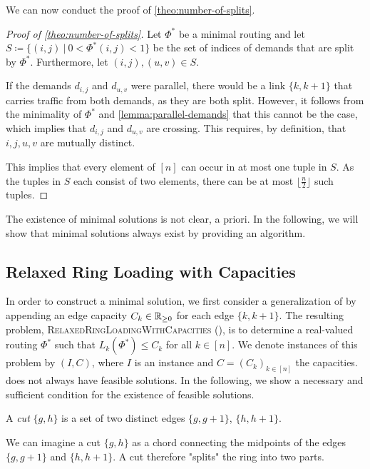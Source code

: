 We can now conduct the proof of \cref{theo:number-of-splits}.
\begin{proof}[Proof of \cref{theo:number-of-splits}]
	Let $\Phi^\ast$ be a minimal routing and let $S \coloneqq \{(i, j)\ |\ 0 < \Phi^\ast(i, j) < 1\}$ be the set of indices of demands that are split by $\Phi^\ast$.
	Furthermore, let $(i, j), (u, v) \in S$.
	
	If the demands $d_{i,j}$ and $d_{u, v}$ were parallel, there would be a link $\{k, k+1\}$ that carries traffic from both demands, as they are both split.
	However, it follows from the minimality of $\Phi^\ast$ and \cref{lemma:parallel-demands} that this cannot be the case, which implies that $d_{i,j}$ and $d_{u, v}$ are crossing.
	This requires, by definition, that $i, j, u, v$ are mutually distinct.
	
	This implies that every element of $[n]$ can occur in at most one tuple in $S$.
	As the tuples in $S$ each consist of two elements, there can be at most $\lfloor\frac{n}{2}\rfloor$ such tuples.
\end{proof}

The existence of minimal solutions is not clear, a priori.
In the following, we will show that minimal solutions always exist by providing an algorithm.

\subsection{Relaxed Ring Loading with Capacities}

In order to construct a minimal solution, we first consider a generalization of \RRL by appending an edge capacity $C_k \in \mathbb{R}_{\geq 0}$ for each edge $\{k, k+1\}$.
The resulting problem, \textsc{RelaxedRingLoadingWithCapacities} (\RRLWC), is to determine a real-valued routing $\Phi^\ast$ such that $L_k(\Phi^\ast) \leq C_k$ for all $k \in [n]$.
We denote instances of this problem by $(I, C)$, where $I$ is an \RRL instance and $C = (C_k)_{k \in [n]}$ the capacities.
\RRLWC does not always have feasible solutions.
In the following, we show a necessary and sufficient condition for the existence of feasible solutions.

\begin{definition}
	A \emph{cut} $\{g, h\}$ is a set of two distinct edges $\{g, g+1\}$, $\{h, h+1\}$.
\end{definition}

We can imagine a cut $\{g, h\}$ as a chord connecting the midpoints of the edges $\{g, g+1\}$ and $\{h, h+1\}$.
A cut therefore "splits" the ring into two parts.

